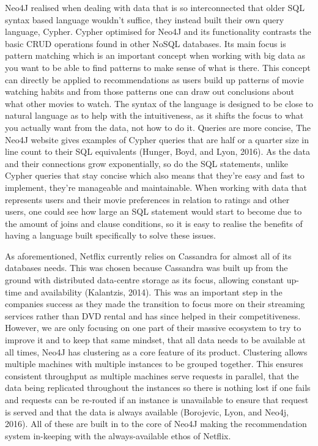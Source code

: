 \documentclass[a4paper]{article}
\begin{document}
Neo4J realised when dealing with data that is so interconnected that older SQL syntax based language wouldn't suffice, they instead built their own query language, Cypher. Cypher optimised for Neo4J and its functionality contrasts the basic CRUD operations found in other NoSQL databases. Its main focus is pattern matching which is an important concept when working with big data as you want to be able to find patterns to make sense of what is there. This concept can directly be applied to recommendations as users build up patterns of movie watching habits and from those patterns one can draw out conclusions about what other movies to watch. The syntax of the language is designed to be close to natural language as to help with the intuitiveness, as it shifts the focus to what you actually want from the data, not how to do it. Queries are more concise, The Neo4J website gives examples of Cypher queries that are half or a quarter size in line count to their SQL equivalents (Hunger, Boyd, and Lyon, 2016). As the data and their connections grow exponentially, so do the SQL statements, unlike Cypher queries that stay concise which also means that they're easy and fast to implement, they're manageable and maintainable. When working with data that represents users and their movie preferences in relation to ratings and other users, one could see how large an SQL statement would start to become due to the amount of joins and clause conditions, so it is easy to realise the benefits of having a language built specifically to solve these issues. \par

As aforementioned, Netflix currently relies on Cassandra for almost all of its databases needs. This was chosen because Cassandra was built up from the ground with distributed data-centre storage as its focus, allowing constant up-time and availability (Kalantzis, 2014). This was an important step in the companies success as they made the transition to focus more on their streaming services rather than DVD rental and has since helped in their competitiveness. However, we are only focusing on one part of their massive ecosystem to try to improve it and to keep that same mindset, that all data needs to be available at all times, Neo4J has clustering as a core feature of its product. Clustering allows multiple machines with multiple instances to be grouped together. This ensures consistent throughput as multiple machines serve requests in parallel, that the data being replicated throughout the instances so there is nothing lost if one fails and requests can be re-routed if an instance is unavailable to ensure that request is served and that the data is always available (Borojevic, Lyon, and Neo4j, 2016). All of these are built in to the core of Neo4J making the recommendation system in-keeping with the always-available ethos of Netflix. \par
\end{document}
